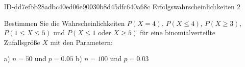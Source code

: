 \begin{exercise}
      {ID-dd7efbb28adbc40ed06e90030b8d45dfc640a68c}
      {Erfolgswahrscheinlichkeiten 2}
  \ifproblem\problem\par
    Bestimmen Sie die Wahrscheinlichkeiten $P(X=4)$, $P(X\leq4)$, $P(X\geq3)$,
    $P(1\leq X\leq5)$ und $P(X\leq1\text{ oder } X\geq5)$ für eine
    binomialverteilte Zufallsgröße $X$ mit den Parametern:
    \begin{center}
      a) $n=50$ und $p=\num{0.05}$
      \quad\quad\quad
      b) $n=100$ und $p=\num{0.03}$
    \end{center}
  \fi
\end{exercise}
